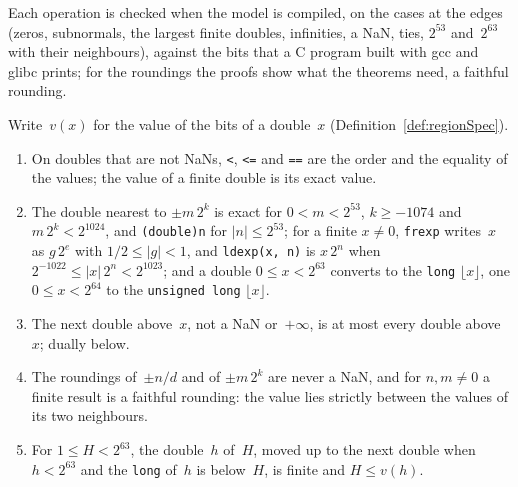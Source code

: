 Each operation is checked when the model is compiled, on the cases at the edges (zeros,
subnormals, the largest finite doubles, infinities, a NaN, ties, $2^{53}$ and~$2^{63}$ with their
neighbours), against the bits that a C program built with gcc and glibc prints; for the roundings
the proofs show what the theorems need, a faithful rounding.

\begin{lemma}\label{lem:doubleValues}
  \leanok
  Write~$v(x)$ for the value of the bits of a double~$x$ (Definition~\ref{def:regionSpec}).
  \begin{enumerate}
    \item On doubles that are not NaNs, \verb|<|, \verb|<=| and \verb|==| are the order and the
      equality of the values; the value of a finite double is its exact value.
    \item The double nearest to $\pm m\,2^k$ is exact for $0 < m < 2^{53}$, $k \ge -1074$ and
      $m\,2^k < 2^{1024}$, and \verb|(double)n| for $|n| \le 2^{53}$; for a finite $x \ne 0$,
      \verb|frexp| writes~$x$ as $g\,2^e$ with $1/2 \le |g| < 1$, and \verb|ldexp(x, n)| is
      $x\,2^n$ when $2^{-1022} \le |x|\,2^n < 2^{1023}$; and a double $0 \le x < 2^{63}$ converts
      to the \verb|long| $\lfloor x \rfloor$, one $0 \le x < 2^{64}$ to the \verb|unsigned long|
      $\lfloor x \rfloor$.
    \item The next double above~$x$, not a NaN or~$+\infty$, is at most every double above~$x$;
      dually below.
    \item The roundings of~$\pm n/d$ and of $\pm m\,2^k$ are never a NaN, and for $n, m \ne 0$ a
      finite result is a faithful rounding: the value lies strictly between the values of its two
      neighbours.
    \item For $1 \le H < 2^{63}$, the double~$h$ of~$H$, moved up to the next double when
      $h < 2^{63}$ and the \verb|long| of~$h$ is below~$H$, is finite and $H \le v(h)$.
  \end{enumerate}
\end{lemma}

